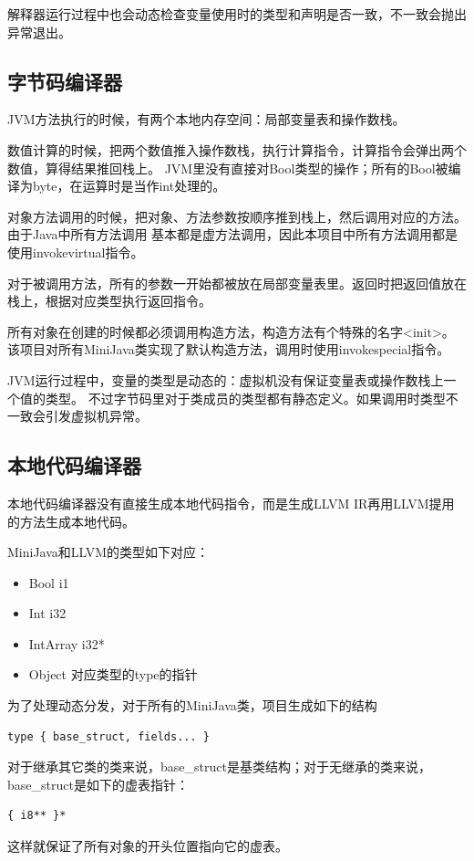 \documentclass[a4paper]{article}
\begin{document}
解释器运行过程中也会动态检查变量使用时的类型和声明是否一致，不一致会抛出异常退出。

\subsection{字节码编译器}
JVM方法执行的时候，有两个本地内存空间：局部变量表和操作数栈。

数值计算的时候，把两个数值推入操作数栈，执行计算指令，计算指令会弹出两个数值，算得结果推回栈上。
JVM里没有直接对Bool类型的操作；所有的Bool被编译为byte，在运算时是当作int处理的。

对象方法调用的时候，把对象、方法参数按顺序推到栈上，然后调用对应的方法。由于Java中所有方法调用
基本都是虚方法调用，因此本项目中所有方法调用都是使用invokevirtual指令。

对于被调用方法，所有的参数一开始都被放在局部变量表里。返回时把返回值放在栈上，根据对应类型执行返回指令。

所有对象在创建的时候都必须调用构造方法，构造方法有个特殊的名字<init>。
该项目对所有MiniJava类实现了默认构造方法，调用时使用invokespecial指令。

JVM运行过程中，变量的类型是动态的：虚拟机没有保证变量表或操作数栈上一个值的类型。
不过字节码里对于类成员的类型都有静态定义。如果调用时类型不一致会引发虚拟机异常。

\subsection{本地代码编译器}
本地代码编译器没有直接生成本地代码指令，而是生成LLVM IR再用LLVM提用的方法生成本地代码。

MiniJava和LLVM的类型如下对应：
\begin{itemize}
    \item Bool \Rightarrow{} i1
    \item Int \Rightarrow{} i32
    \item IntArray \Rightarrow{} i32*
    \item Object \Rightarrow{} 对应类型的type的指针
\end{itemize}

为了处理动态分发，对于所有的MiniJava类，项目生成如下的结构
\begin{lstlisting}[style=llvm]
    type { base_struct, fields... }
\end{lstlisting} \par
对于继承其它类的类来说，base\_struct是基类结构；对于无继承的类来说，base\_struct是如下的虚表指针：
\begin{lstlisting}[style=llvm]
    { i8** }*
\end{lstlisting} \par
这样就保证了所有对象的开头位置指向它的虚表。
\end{document}
